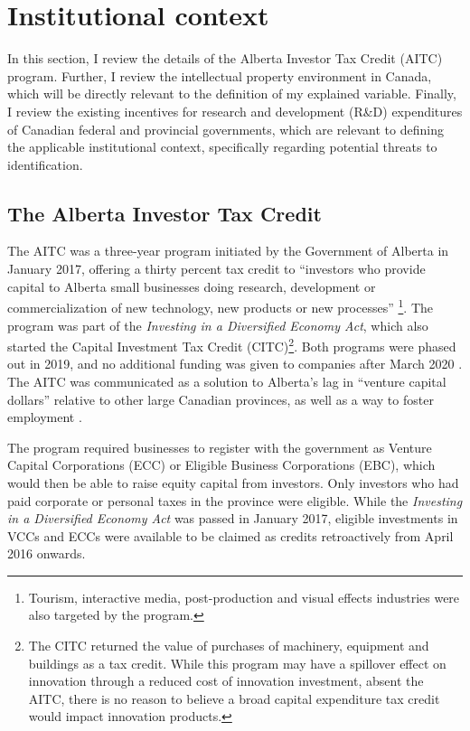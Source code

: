 \documentclass[../main.tex]{subfiles}
\begin{document}
\section{Institutional context}
\label{sec:institutional_background}

In this section, I review the details of the Alberta Investor Tax Credit (AITC) program. Further, I review the intellectual property environment in Canada, which will be directly relevant to the definition of my explained variable. Finally, I review the existing incentives for research and development (R\&D) expenditures of Canadian federal and provincial governments, which are relevant to defining the applicable institutional context, specifically regarding potential threats to identification.

\subsection{The Alberta Investor Tax Credit}

The AITC was a three-year program initiated by the Government of Alberta in January 2017, offering a thirty percent tax credit to \enquote{investors who provide capital to Alberta small businesses doing research, development or commercialization of new technology, new products or new processes} \parencite[p.1]{albertaeconomicdevelopmentandtrade17}\footnote{Tourism, interactive media, post-production and visual effects industries were also targeted by the program.}. The program was part of the \textit{Investing in a Diversified Economy Act}\nocite{Investing16}, which also started the Capital Investment Tax Credit (CITC)\footnote{The CITC returned the value of purchases of machinery, equipment and buildings as a tax credit. While this program may have a spillover effect on innovation through a reduced cost of innovation investment, absent the AITC, there is no reason to believe a broad capital expenditure tax credit would impact innovation products.}. Both programs were phased out in 2019, and no additional funding was given to companies after March 2020 \parencite{albertaeconomicdevelopmentandtrade19}. The AITC was communicated as a solution to Alberta's lag in \enquote{venture capital dollars} \parencite[p.1]{albertaeconomicdevelopmentandtrade17} relative to other large Canadian provinces, as well as a way to foster employment \parencite{zabjeck16}.

The program required businesses to register with the government as Venture Capital Corporations (ECC) or Eligible Business Corporations (EBC), which would then be able to raise equity capital from investors. Only investors who had paid corporate or personal taxes in the province were eligible. While the \textit{Investing in a Diversified Economy Act} was passed in January 2017, eligible investments in VCCs and ECCs were available to be claimed as credits retroactively from April 2016 onwards.
\end{document}
